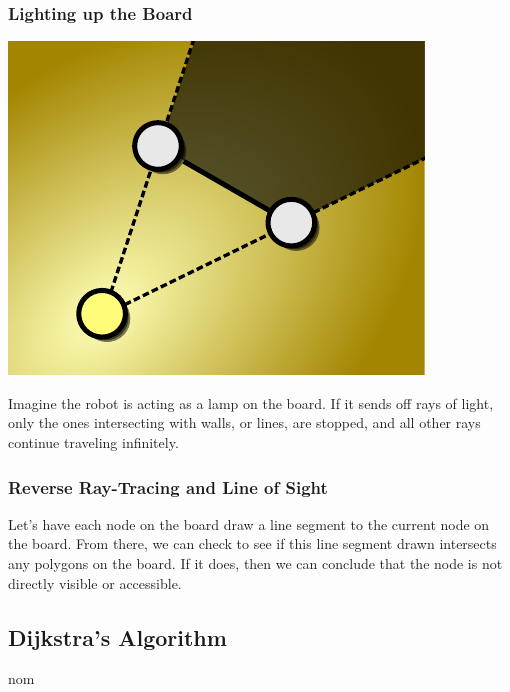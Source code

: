\documentclass[letterpaper, 12pt]{article}
\begin{document}
\begin{multicols}{2}
\subsubsection{Lighting up the Board}

\includegraphics[width=\columnwidth]{img/light.pdf}

Imagine the robot is acting as a lamp on the board. If it sends off rays of
light, only the ones intersecting with walls, or lines, are stopped, and all
other rays continue traveling infinitely.

\subsubsection{Reverse Ray-Tracing and Line of Sight}

Let's have each node on the board draw a line segment to the current node on the
board. From there, we can check to see if this line segment drawn intersects any
polygons on the board. If it does, then we can conclude that the node is not
directly visible or accessible.

\subsection{Dijkstra's Algorithm}

nom

\end{multicols}
\end{document}
